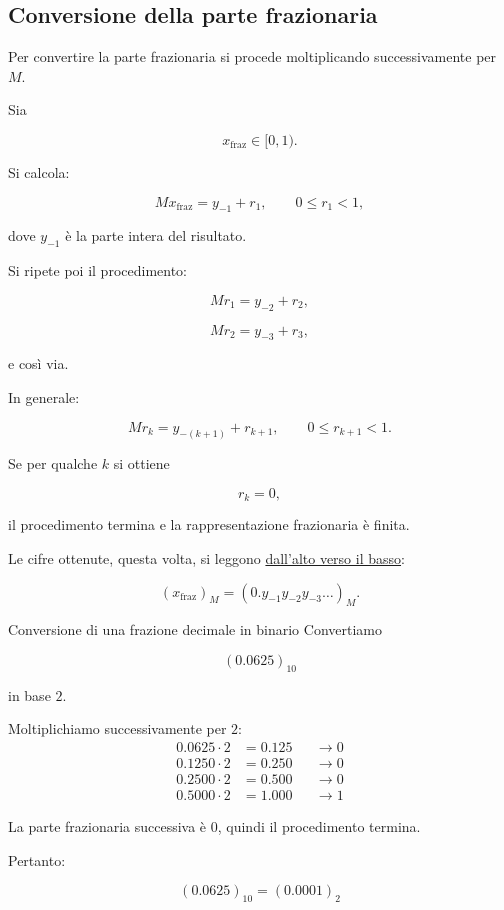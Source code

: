 \documentclass{article}
\begin{document}
\subsection{Conversione della parte frazionaria}

Per convertire la parte frazionaria si procede moltiplicando successivamente per $M$.

Sia

$$
    x_{\mathrm{fraz}}\in[0,1).
$$

Si calcola:

$$
    Mx_{\mathrm{fraz}}=y_{-1}+r_1,
    \qquad
    0\le r_1<1,
$$

dove $y_{-1}$ è la parte intera del risultato.

Si ripete poi il procedimento:

$$
    Mr_1=y_{-2}+r_2,
$$

$$
    Mr_2=y_{-3}+r_3,
$$

e così via.

In generale:

$$
    Mr_k=y_{-(k+1)}+r_{k+1},
    \qquad
    0\le r_{k+1}<1.
$$

Se per qualche $k$ si ottiene

$$
    r_k=0,
$$

il procedimento termina e la rappresentazione frazionaria è finita.

Le cifre ottenute, questa volta, si leggono \underline{dall'alto verso il basso}:

$$
    (x_{\mathrm{fraz}})_M
    =
    (0.y_{-1}y_{-2}y_{-3}\dots)_M.
$$

\begin{ex}{Conversione di una frazione decimale in binario}{}
    Convertiamo

    $$
        (0.0625)_{10}
    $$

    in base $2$.

    Moltiplichiamo successivamente per $2$:
    \begin{align*}
        0.0625\cdot2 & =0.125
                     &        & \longrightarrow 0 \\
        0.1250\cdot2 & =0.250
                     &        & \longrightarrow 0 \\
        0.2500\cdot2 & =0.500
                     &        & \longrightarrow 0 \\
        0.5000\cdot2 & =1.000
                     &        & \longrightarrow 1
    \end{align*}

    La parte frazionaria successiva è $0$, quindi il procedimento termina.

    Pertanto:

    $$
        \boxed{(0.0625)_{10}=(0.0001)_2}
    $$

\end{ex}
\end{document}
